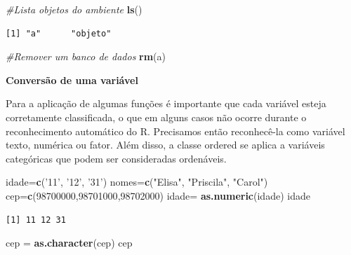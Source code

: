 \documentclass[12pt,brazil,oneside]{book}
\newenvironment{Shaded}{\begin{snugshade}}{\end{snugshade}}
\newcommand{\CommentTok}[1]{\textcolor[rgb]{0.56,0.35,0.01}{\textit{#1}}}
\newcommand{\DecValTok}[1]{\textcolor[rgb]{0.00,0.00,0.81}{#1}}
\newcommand{\KeywordTok}[1]{\textcolor[rgb]{0.13,0.29,0.53}{\textbf{#1}}}
\newcommand{\NormalTok}[1]{#1}
\newcommand{\StringTok}[1]{\textcolor[rgb]{0.31,0.60,0.02}{#1}}
\begin{document}
\begin{Shaded}
\begin{Highlighting}[]
\CommentTok{#Lista objetos do ambiente}
\KeywordTok{ls}\NormalTok{()}
\end{Highlighting}
\end{Shaded}

\begin{verbatim}
[1] "a"      "objeto"
\end{verbatim}

\begin{Shaded}
\begin{Highlighting}[]
\CommentTok{#Remover um banco de dados}
\KeywordTok{rm}\NormalTok{(a)}
\end{Highlighting}
\end{Shaded}

\textbf{Conversão de uma variável}

Para a aplicação de algumas funções é importante que cada variável esteja corretamente classificada, o que em alguns casos não ocorre durante o reconhecimento automático do R. Precisamos então reconhecê-la como variável texto, numérica ou fator. Além disso, a classe ordered se aplica a variáveis categóricas que podem ser consideradas ordenáveis.

\begin{Shaded}
\begin{Highlighting}[]
\NormalTok{idade=}\KeywordTok{c}\NormalTok{(}\StringTok{'11'}\NormalTok{, }\StringTok{'12'}\NormalTok{, }\StringTok{'31'}\NormalTok{)}
\NormalTok{nomes=}\KeywordTok{c}\NormalTok{(}\StringTok{"Elisa"}\NormalTok{, }\StringTok{"Priscila"}\NormalTok{, }\StringTok{"Carol"}\NormalTok{)}
\NormalTok{cep=}\KeywordTok{c}\NormalTok{(}\DecValTok{98700000}\NormalTok{,}\DecValTok{98701000}\NormalTok{,}\DecValTok{98702000}\NormalTok{)}
\NormalTok{idade=}\StringTok{ }\KeywordTok{as.numeric}\NormalTok{(idade)}
\NormalTok{idade}
\end{Highlighting}
\end{Shaded}

\begin{verbatim}
[1] 11 12 31
\end{verbatim}

\begin{Shaded}
\begin{Highlighting}[]
\NormalTok{cep =}\StringTok{ }\KeywordTok{as.character}\NormalTok{(cep)}
\NormalTok{cep}
\end{Highlighting}
\end{Shaded}
\end{document}
